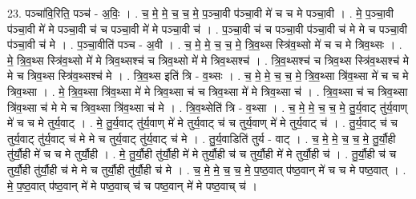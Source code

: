 \documentclass[17pt]{extarticle}
\begin{document}
23. पञ्चा॑वि॒रिति॒ पञ्च॑ - अ॒विः॒ । . च॒ मे॒ मे॒ च॒ च॒ मे॒ प॒ञ्चा॒वी प॑ञ्चा॒वी मे॑ च च मे पञ्चा॒वी । . मे॒ प॒ञ्चा॒वी प॑ञ्चा॒वी मे॑ मे पञ्चा॒वी च॑ च पञ्चा॒वी मे॑ मे पञ्चा॒वी च॑ । . प॒ञ्चा॒वी च॑ च पञ्चा॒वी प॑ञ्चा॒वी च॑ मे मे च पञ्चा॒वी प॑ञ्चा॒वी च॑ मे । . प॒ञ्चा॒वीति॑ पञ्च - अ॒वी । . च॒ मे॒ मे॒ च॒ च॒ मे॒ त्रि॒व॒थ्स स्त्रि॑व॒थ्सो मे॑ च च मे त्रिव॒थ्सः । . मे॒ त्रि॒व॒थ्स स्त्रि॑व॒थ्सो मे॑ मे त्रिव॒थ्सश्च॑ च त्रिव॒थ्सो मे॑ मे त्रिव॒थ्सश्च॑ । . त्रि॒व॒थ्सश्च॑ च त्रिव॒थ्स स्त्रि॑व॒थ्सश्च॑ मे मे च त्रिव॒थ्स स्त्रि॑व॒थ्सश्च॑ मे । . त्रि॒व॒थ्स इति॑ त्रि - व॒थ्सः । . च॒ मे॒ मे॒ च॒ च॒ मे॒ त्रि॒व॒थ्सा त्रि॑व॒थ्सा मे॑ च च मे त्रिव॒थ्सा । . मे॒ त्रि॒व॒थ्सा त्रि॑व॒थ्सा मे॑ मे त्रिव॒थ्सा च॑ च त्रिव॒थ्सा मे॑ मे त्रिव॒थ्सा च॑ । . त्रि॒व॒थ्सा च॑ च त्रिव॒थ्सा त्रि॑व॒थ्सा च॑ मे मे च त्रिव॒थ्सा त्रि॑व॒थ्सा च॑ मे । . त्रि॒व॒थ्सेति॑ त्रि - व॒थ्सा । . च॒ मे॒ मे॒ च॒ च॒ मे॒ तु॒र्य॒वाट् तु॑र्य॒वाण् मे॑ च च मे तुर्य॒वाट् । . मे॒ तु॒र्य॒वाट् तु॑र्य॒वाण् मे॑ मे तुर्य॒वाट् च॑ च तुर्य॒वाण् मे॑ मे तुर्य॒वाट् च॑ । . तु॒र्य॒वाट् च॑ च तुर्य॒वाट् तु॑र्य॒वाट् च॑ मे मे च तुर्य॒वाट् तु॑र्य॒वाट् च॑ मे । . तु॒र्य॒वाडिति॑ तुर्य - वाट् । . च॒ मे॒ मे॒ च॒ च॒ मे॒ तु॒र्यौ॒ही तु॑र्यौ॒ही मे॑ च च मे तुर्यौ॒ही । . मे॒ तु॒र्यौ॒ही तु॑र्यौ॒ही मे॑ मे तुर्यौ॒ही च॑ च तुर्यौ॒ही मे॑ मे तुर्यौ॒ही च॑ । . तु॒र्यौ॒ही च॑ च तुर्यौ॒ही तु॑र्यौ॒ही च॑ मे मे च तुर्यौ॒ही तु॑र्यौ॒ही च॑ मे । . च॒ मे॒ मे॒ च॒ च॒ मे॒ प॒ष्ठ॒वात् प॑ष्ठ॒वान् मे॑ च च मे पष्ठ॒वात् । . मे॒ प॒ष्ठ॒वात् प॑ष्ठ॒वान् मे॑ मे पष्ठ॒वाच् च॑ च पष्ठ॒वान् मे॑ मे पष्ठ॒वाच् च॑ । \newline
\end{document}
